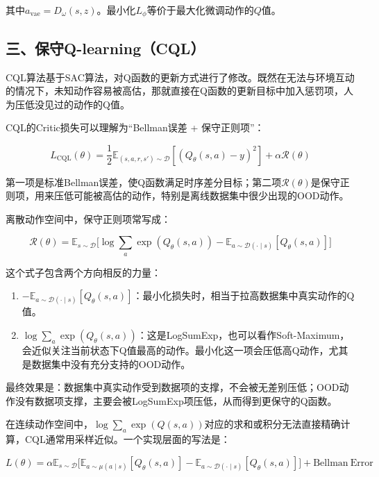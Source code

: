 其中\(a_{\mathrm{vae}}=D_\omega(s,z)\)。最小化\(L_\phi\)等价于最大化微调动作的\(Q\)值。

\hypertarget{ux4e09ux4fddux5b88q-learningcql}{%
\subsection{三、保守Q-learning（CQL）}\label{ux4e09ux4fddux5b88q-learningcql}}

CQL算法基于SAC算法，对Q函数的更新方式进行了修改。既然在无法与环境互动的情况下，未知动作容易被高估，那就直接在Q函数的更新目标中加入惩罚项，人为压低没见过的动作的Q值。

CQL的Critic损失可以理解为``Bellman误差 + 保守正则项''：

\[
L_{\mathrm{CQL}}(\theta)
=\frac{1}{2}\mathbb{E}_{(s,a,r,s')\sim\mathcal D}
[(Q_\theta(s,a)-y)^{2}]
+\alpha \mathcal R(\theta)
\]

第一项是标准Bellman误差，使Q函数满足时序差分目标；第二项\(\mathcal R(\theta)\)是保守正则项，用来压低可能被高估的动作，特别是离线数据集中很少出现的OOD动作。

离散动作空间中，保守正则项常写成：

\[
\mathcal R(\theta)
=\mathbb{E}_{s\sim\mathcal D}
\bigl[
\log \sum_a \exp(Q_\theta(s,a))
-\mathbb{E}_{a\sim\mathcal D(\cdot\mid s)}[Q_\theta(s,a)]
\bigr]
\]

这个式子包含两个方向相反的力量：

\begin{enumerate}
\def\labelenumi{\arabic{enumi}.}
\tightlist
\item
  \(-\mathbb{E}_{a\sim\mathcal D(\cdot\mid s)}[Q_\theta(s,a)]\)：最小化损失时，相当于拉高数据集中真实动作的Q值。
\item
  \(\log \sum_a \exp(Q_\theta(s,a))\)：这是LogSumExp，也可以看作Soft-Maximum，会近似关注当前状态下Q值最高的动作。最小化这一项会压低高Q动作，尤其是数据集中没有充分支持的OOD动作。
\end{enumerate}

最终效果是：数据集中真实动作受到数据项的支撑，不会被无差别压低；OOD动作没有数据项支撑，主要会被LogSumExp项压低，从而得到更保守的Q函数。

在连续动作空间中，\(\log\sum_a\exp(Q(s,a))\)对应的求和或积分无法直接精确计算，CQL通常用采样近似。一个实现层面的写法是：

\[
L(\theta)
=\alpha\mathbb{E}_{s\sim\mathcal D}
\bigl[
\mathbb{E}_{a\sim\mu(a\mid s)}[Q_\theta(s,a)]
-\mathbb{E}_{a\sim\mathcal D(\cdot\mid s)}[Q_\theta(s,a)]
\bigr]
+\mathrm{Bellman\ Error}
\]

